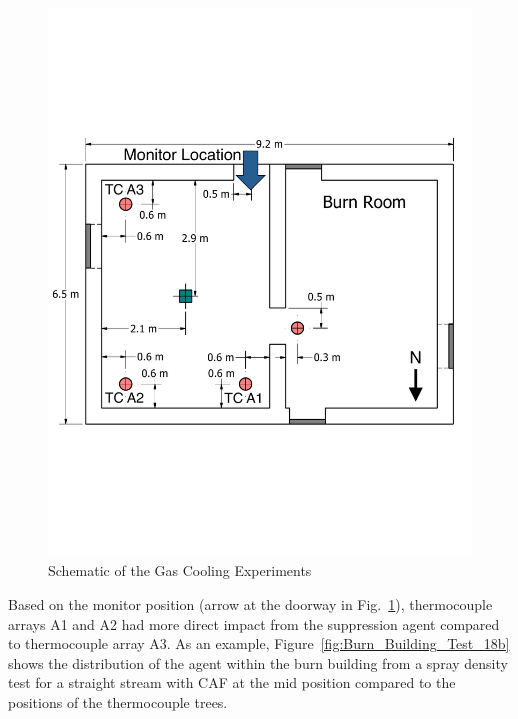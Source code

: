 \documentclass[12pt,oneside]{book}
\begin{document}
\begin{figure}[!ht]
	\includegraphics[width=\columnwidth]{../Figures/Floor_Plans/PDFs/West_Structure/DelCo_2012_West_Structure_Instrumentation2}
	\caption{Schematic of  the Gas Cooling Experiments}
	\label{fig:Gas_Cooling_Instrumentation_Dimensions2}
\end{figure}
Based on the monitor position (arrow at the doorway in Fig.~\ref{fig:Gas_Cooling_Instrumentation_Dimensions2}), thermocouple arrays A1 and A2 had more direct impact from the suppression agent compared to thermocouple array A3. As an example, Figure~\ref{fig:Burn_Building_Test_18b} shows the distribution of the agent within the burn building from a spray density test for a straight stream with CAF at the mid position compared to the positions of the thermocouple trees.
\end{document}

